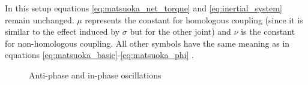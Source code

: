 \documentclass[12pt,twoside]{article}
\theoremstyle{plain}
\theoremstyle{definition}
\theoremstyle{remark}
\begin{document}
\begin{enumerate}
In this setup equations \ref{eq:matsuoka_net_torque} and  \ref{eq:inertial_system} remain unchanged. $\mu$ represents the constant for homologous coupling (since it is similar to the effect induced by $\sigma$ but for the other joint) and $\nu$ is the constant for non-homologous coupling. All other symbols have the same meaning as in equations  \ref{eq:matsuoka_basic}-\ref{eq:matsuoka_phi} \cite{Ronsse2009}.
\end{enumerate}

\begin{figure}[htbp]
\centering     %
{}
\caption{Anti-phase and in-phase oscillations}
\label{fig:in-anti-phase}
\end{figure}
\end{document}
